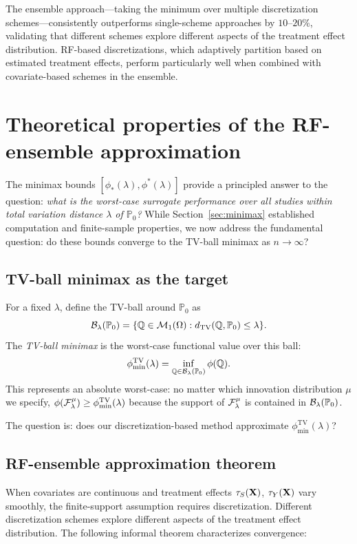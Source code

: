 \documentclass{article}
\newcommand{\PP}{\mathbb{P}}
\begin{document}
The ensemble approach---taking the minimum over multiple discretization schemes---consistently outperforms single-scheme approaches by $10$--$20\%$, validating that different schemes explore different aspects of the treatment effect distribution. RF-based discretizations, which adaptively partition based on estimated treatment effects, perform particularly well when combined with covariate-based schemes in the ensemble.

\section{Theoretical properties of the RF-ensemble approximation}

The minimax bounds $[\phi_*(\lambda), \phi^*(\lambda)]$ provide a principled answer to the question: \emph{what is the worst-case surrogate performance over all studies within total variation distance $\lambda$ of $\PP_0$?} While Section~\ref{sec:minimax} established computation and finite-sample properties, we now address the fundamental question: do these bounds converge to the TV-ball minimax as $n \to \infty$?

\subsection{TV-ball minimax as the target}

For a fixed $\lambda$, define the TV-ball around $\PP_0$ as
\[
    \cB_\lambda(\PP_0) = \{\Q \in \cM_1(\Omega) : d_{\mathrm{TV}}(\Q, \PP_0) \leq \lambda\}.
\]
The \emph{TV-ball minimax} is the worst-case functional value over this ball:
\begin{align}\label{eq:tv-minimax}
    \phi_{\min}^{\mathrm{TV}}(\lambda) = \inf_{\Q \in \cB_\lambda(\PP_0)} \phi(\Q).
\end{align}
This represents an absolute worst-case: no matter which innovation distribution $\mu$ we specify, $\phi(\mathcal{F}_\lambda^\mu) \geq \phi_{\min}^{\mathrm{TV}}(\lambda)$ because the support of $\mathcal{F}_\lambda^\mu$ is contained in $\cB_\lambda(\PP_0)$.

The question is: does our discretization-based method approximate $\phi_{\min}^{\mathrm{TV}}(\lambda)$?

\subsection{RF-ensemble approximation theorem}

When covariates are continuous and treatment effects $\tau_S(\mathbf{X})$, $\tau_Y(\mathbf{X})$ vary smoothly, the finite-support assumption requires discretization. Different discretization schemes explore different aspects of the treatment effect distribution. The following informal theorem characterizes convergence:
\end{document}
